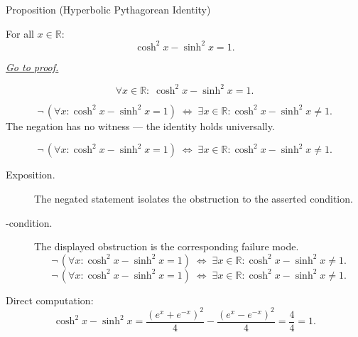 \begin{propositionbox}{Proposition (Hyperbolic Pythagorean Identity)}
\begin{proposition}
\label{prop:hyperbolic-pythagorean}
For all $x \in \mathbb{R}$:
\[
  \cosh^2 x - \sinh^2 x = 1.
\]

\smallskip\noindent


\hyperref[prf:hyperbolic-pythagorean]{\textit{Go to proof.}}
\end{proposition}
\end{propositionbox}

\begin{remark*}
\[
  \forall x \in \mathbb{R} :\; \cosh^2 x - \sinh^2 x = 1.
\]
\end{remark*}

\begin{remark*}
\[
  \neg\,(\forall x:\cosh^2 x - \sinh^2 x=1)
  \;\iff\;
  \exists x\in\mathbb{R}:\cosh^2 x - \sinh^2 x\neq 1.
\]
The negation has no witness --- the identity holds universally.
\end{remark*}

\begin{remark*}
\[
\neg\,(\forall x:\cosh^2 x - \sinh^2 x=1)
  \;\iff\;
  \exists x\in\mathbb{R}:\cosh^2 x - \sinh^2 x\neq 1.
\]
\end{remark*}

\begin{remark*}
\begin{description}
  \item[Exposition.]
  The negated statement isolates the obstruction to the asserted condition.

  \item[\neq-condition.]
  The displayed obstruction is the corresponding failure mode.
  \[
\neg\,(\forall x:\cosh^2 x - \sinh^2 x=1)
  \;\iff\;
  \exists x\in\mathbb{R}:\cosh^2 x - \sinh^2 x\neq 1.
  \]
  \[
\neg\,(\forall x:\cosh^2 x - \sinh^2 x=1)
  \;\iff\;
  \exists x\in\mathbb{R}:\cosh^2 x - \sinh^2 x\neq 1.
  \]
\end{description}
\end{remark*}



\begin{remark*}[Interpretation]
Direct computation:
\[
  \cosh^2 x - \sinh^2 x
  = \frac{(e^x+e^{-x})^2}{4} - \frac{(e^x-e^{-x})^2}{4}
  = \frac{4}{4} = 1.
\]
\end{remark*}

